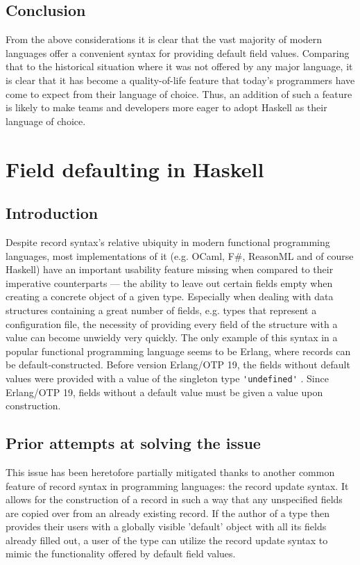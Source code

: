 \documentclass[en]{pracamgr}
\newcommand{\code}[1]{\lstinline[breaklines=true]{#1}}
\begin{document}
\subsection{Conclusion}
From the above considerations it is clear that the vast majority of modern languages 
offer a convenient syntax for providing default field values. 
Comparing that to the historical situation where it was not offered by any major language,
it is clear that it has become a quality-of-life feature 
that today's programmers have come to expect from their language of choice.
Thus, an addition of such a feature is likely to make teams and developers more eager to adopt Haskell as their language of choice.

\section{Field defaulting in Haskell}
\subsection{Introduction}
Despite record syntax's relative ubiquity in modern functional programming languages, most implementations
of it (e.g. OCaml, F\#, ReasonML and of course Haskell) have an important usability feature missing when compared
to their imperative counterparts --- the ability to leave out certain fields empty
when creating a concrete object of a given type. Especially when dealing with
data structures containing a great number of fields, e.g. types that represent
a configuration file, the necessity of providing every field 
of the structure with a value can become unwieldy very quickly. 
The only example of this syntax in a popular functional programming language seems to be Erlang,
where records can be default-constructed. Before version Erlang/OTP 19, the fields without default values were provided 
with a value of the singleton type \code{'undefined'} \cite{ErlangRecords}. 
Since Erlang/OTP 19, fields without a default value must be given a value upon construction.

\subsection{Prior attempts at solving the issue}\label{ss:prior}
This issue has been heretofore partially mitigated thanks to another common feature of record syntax in programming languages: the record update syntax. 
It allows for the construction of a record in such a way that any unspecified fields are copied over from an already existing record. 
If the author of a type then provides their users with a globally visible 'default' object with all its fields already filled out, 
a user of the type can utilize the record update syntax to mimic the functionality offered by default field values.
\end{document}
